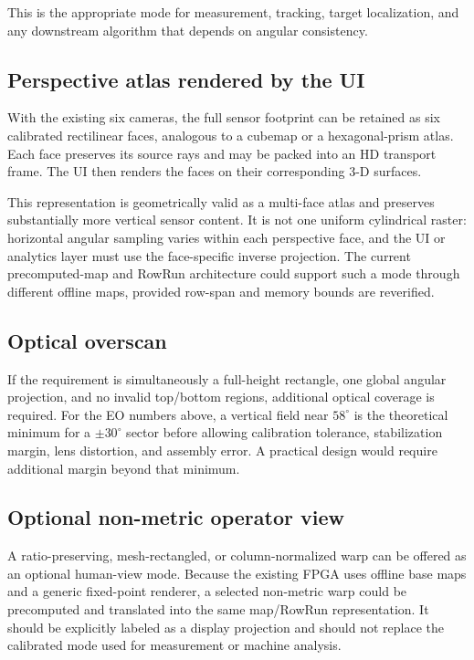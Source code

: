 \documentclass[10pt]{article}
\begin{document}
This is the appropriate mode for measurement, tracking, target localization, and any downstream algorithm that depends on angular consistency.

\subsection{Perspective atlas rendered by the UI}

With the existing six cameras, the full sensor footprint can be retained as six calibrated rectilinear faces, analogous to a cubemap or a hexagonal-prism atlas. Each face preserves its source rays and may be packed into an HD transport frame. The UI then renders the faces on their corresponding 3-D surfaces.

This representation is geometrically valid as a multi-face atlas and preserves substantially more vertical sensor content. It is not one uniform cylindrical raster: horizontal angular sampling varies within each perspective face, and the UI or analytics layer must use the face-specific inverse projection. The current precomputed-map and RowRun architecture could support such a mode through different offline maps, provided row-span and memory bounds are reverified.

\subsection{Optical overscan}

If the requirement is simultaneously a full-height rectangle, one global angular projection, and no invalid top/bottom regions, additional optical coverage is required. For the EO numbers above, a vertical field near $58^\circ$ is the theoretical minimum for a $\pm30^\circ$ sector before allowing calibration tolerance, stabilization margin, lens distortion, and assembly error. A practical design would require additional margin beyond that minimum.

\subsection{Optional non-metric operator view}

A ratio-preserving, mesh-rectangled, or column-normalized warp can be offered as an optional human-view mode. Because the existing FPGA uses offline base maps and a generic fixed-point renderer, a selected non-metric warp could be precomputed and translated into the same map/RowRun representation. It should be explicitly labeled as a display projection and should not replace the calibrated mode used for measurement or machine analysis.
\end{document}
